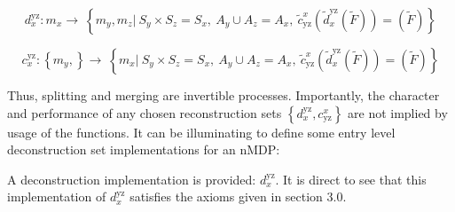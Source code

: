 \documentclass[compsoc,journal,letterpaper,10pt,draftclsnofoot,onecolumn]{IEEEtran}
\begin{document}
\label{nauxefve-deconstruction-and-reconstruction}
 
\begin{equation}
d_{x}^{\text{yz}}:m_{x} \rightarrow \ \left\{ m_{y},m_{z}|\ S_{y} \times S_{z} = S_{x},\ A_{y} \cup A_{z} = A_{x},\ {\tilde{c}}_{\text{yz}}^{x}\left( {\tilde{d}}_{x}^{\text{yz}}\left( \tilde{F} \right) \right) = \left( \tilde{F} \right) \right\} 
\end{equation}

\begin{equation}
c_{x}^{\text{yz}}:\left\{ m_{y}, \right\} \rightarrow \ \left\{ m_{x}|\ S_{y} \times S_{z} = S_{x},\ A_{y} \cup A_{z} = A_{x},\ {\tilde{c}}_{\text{yz}}^{x}\left( {\tilde{d}}_{x}^{\text{yz}}\left( \tilde{F} \right) \right) = \left( \tilde{F} \right) \right\} 
\end{equation}

Thus, splitting and merging are invertible processes. Importantly, the
character and performance of any chosen reconstruction sets
\(\left\{ d_{x}^{\text{yz}},c_{\text{yz}}^{x} \right\}\) are not implied
by usage of the functions. It can be illuminating to define some entry
level deconstruction set implementations for an nMDP:

\label{example-nauxefve-deconstruction}

A deconstruction implementation is provided: \(d_{x}^{\text{yz}}\). It
is direct to see that this implementation of \(d_{x}^{\text{yz}}\)
satisfies the axioms given in section 3.0.
\end{document}
